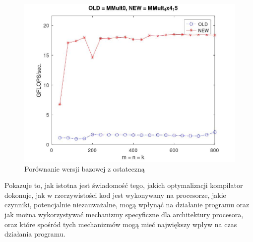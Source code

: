\documentclass{article}
\begin{document}
\begin{figure}[H]
    \centering
    \includegraphics[width=1.0\textwidth]{figure11.jpg}
    \caption{Porównanie wersji bazowej z ostateczną}
\end{figure}

Pokazuje to, jak istotna jest świadomość tego, jakich optymalizacji kompilator dokonuje, jak w rzeczywistości kod jest wykonywany na procesorze, jakie czynniki, potencjalnie niezauważalne, mogą wpłynąć na działanie programu oraz jak można wykorzystywać mechanizmy
specyficzne dla architektury procesora, oraz które spośród tych mechanizmów mogą mieć największy
wpływ na czas działania programu.
\end{document}

